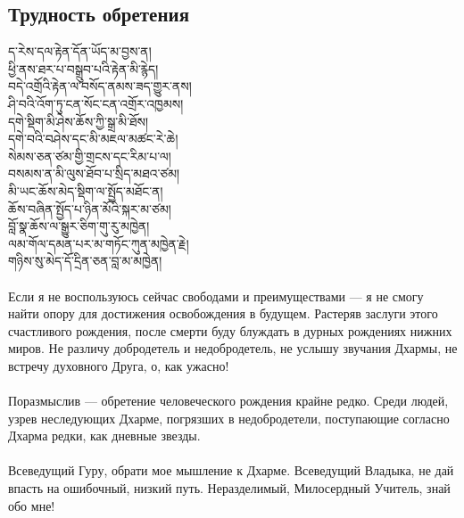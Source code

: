 \subsection*{Трудность обретения}
\ti ད་རེས་དལ་རྟེན་དོན་ཡོད་མ་བྱས་ན།\\
ཕྱི་ནས་ཐར་པ་བསྒྲུབ་པའི་རྟེན་མི་རྙེད།\\
བདེ་འགྲོའི་རྟེན་ལ་བསོད་ནམས་ཟད་གྱུར་ནས།\\
ཤི་བའི་འོག་ཏུ་ངན་སོང་ངན་འགྲོར་འཁྱམས།\\
དགེ་སྡིག་མི་ཤེས་ཆོས་ཀྱི་སྒྲ་མི་ཐོས།\\
དགེ་བའི་བཤེས་དང་མི་མཇལ་མཚང་རེ་ཆེ།\\
སེམས་ཅན་ཙམ་གྱི་གྲངས་དང་རིམ་པ་ལ།\\
བསམས་ན་མི་ལུས་ཐོབ་པ་སྲིད་མཐའ་ཙམ།\\
མི་ཡང་ཆོས་མེད་སྡིག་ལ་སྤྱོད་མཐོང་ན།\\
ཆོས་བཞིན་སྤྱོད་པ་ཉིན་མོའི་སྐར་མ་ཙམ།\\
བློ་སྣ་ཆོས་ལ་སྒྱུར་ཅིག་གུ་རུ་མཁྱེན།\\
ལམ་གོལ་དམན་པར་མ་གཏོང་ཀུན་མཁྱེན་རྗེ།\\
གཉིས་སུ་མེད་དོ་དྲིན་ཅན་བླ་མ་མཁྱེན།\\
\\
\ru
Если я не воспользуюсь сейчас свободами и преимуществами —
я не смогу найти опору для достижения освобождения в будущем.
Растеряв заслуги этого счастливого рождения,
после смерти буду блуждать в дурных рождениях нижних миров.
Не различу добродетель и недобродетель, не услышу звучания Дхармы,
не встречу духовного Друга, о, как ужасно!\\
\\
Поразмыслив — обретение человеческого рождения крайне ред\-ко.
Среди людей, узрев неследующих Дхарме, погрязших в недобродетели,
поступающие согласно Дхарма редки, как дневные звезды.\\
\\
Всеведущий Гуру, обрати мое мышление к Дхарме.
Всеведущий Владыка, не дай впасть на ошибочный, низкий путь.
Нераздели\-мый, Милосердный Учитель, знай обо мне!
\newpage
